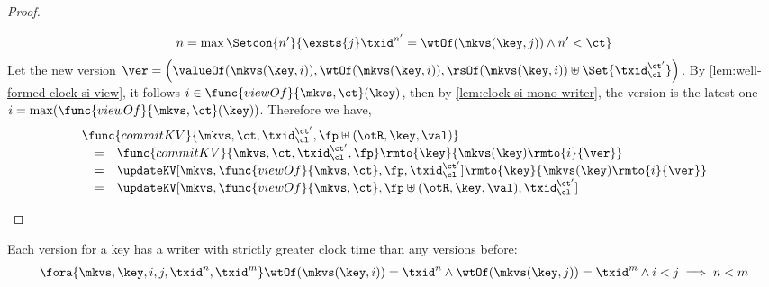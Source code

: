 \begin{proof}
\begin{itemize}
            \[
                n = \max\Setcon{n'}{%
                    \exsts{j} 
                    \txid^{n'} = \wtOf(\mkvs(\key, j)) 
                    \land n' < \ct%
                } 
            \]
            Let the new version \( \ver = \left( \valueOf(\mkvs(\key,i)), \wtOf(\mkvs(\key,i)), \rsOf(\mkvs(\key,i)) \uplus \Set{\txid_\cl^{\ct'}} \right) \).
            By \cref{lem:well-formed-clock-si-view}, it follows \( i \in \func{viewOf}{\mkvs,\ct}(\key) \), then by \cref{lem:clock-si-mono-writer}, the version is the latest one \( i = \max(\func{viewOf}{\mkvs,\ct}(\key)) \).
            Therefore we have,
            \[
                \begin{array}{@{}l@{}}
                \func{commitKV}{\mkvs,\ct,\txid_\cl^{\ct'},\fp \uplus (\otR, \key, \val)}  \\
                \quad \begin{array}[t]{@{}c l@{}}
                = &
                \func{commitKV}{\mkvs,\ct,\txid_\cl^{\ct'},\fp}\rmto{\key}{\mkvs(\key)\rmto{i}{\ver}} \\
                = & 
                \updateKV[\mkvs,\func{viewOf}{\mkvs,\ct},\fp,\txid_\cl^{\ct'}]\rmto{\key}{\mkvs(\key)\rmto{i}{\ver}} \\
                = & 
                \updateKV[\mkvs,\func{viewOf}{\mkvs,\ct},\fp \uplus (\otR, \key, \val),\txid_\cl^{\ct'}]
                \end{array}
                \end{array}
            \]
    \end{itemize}
\end{proof}

\begin{lemma}
    \label{lem:clock-si-mono-writer}
    Each version for a key has a writer with strictly greater clock time than any versions before:
    \[
        \begin{array}{@{}l@{}}
            \fora{\mkvs,\key,i,j,\txid^n,\txid^m} 
            \wtOf(\mkvs(\key,i)) = \txid^n 
            \land \wtOf(\mkvs(\key,j)) = \txid^m 
            \land i < j
            \implies 
            n < m
        \end{array}
    \]
\end{lemma}

